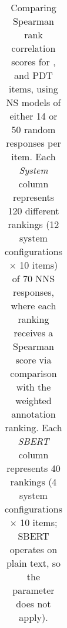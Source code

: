 \begin{table}[htb!]
\begin{center}
\begin{tabular}{|l||l|l||l|l||l|l|}
\hline
\end{tabular}
\caption{\label{tab:transitivity-results} Comparing Spearman rank correlation scores for ,  and  PDT items, using NS models of either 14 or 50 random responses per item. Each \textit{System} column represents 120 different rankings (12 system configurations $\times$ 10 items) of 70 NNS responses, where each ranking receives a Spearman score via comparison with the weighted annotation ranking. Each \textit{SBERT} column represents 40 rankings (4 system configurations $\times$ 10 items; SBERT operates on plain text, so the  parameter does not apply).
}
\end{center}
\end{table}




